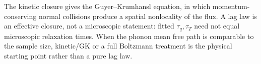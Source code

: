 \begin{summarybox}[Summary]
The kinetic closure gives the Guyer--Krumhansl equation, in which momentum-conserving normal collisions produce a spatial nonlocality of the flux. A lag law is an effective closure, not a microscopic statement: fitted $\tau_q,\tau_T$ need not equal microscopic relaxation times. When the phonon mean free path is comparable to the sample size, kinetic/GK or a full Boltzmann treatment is the physical starting point rather than a pure lag law.
\end{summarybox}
